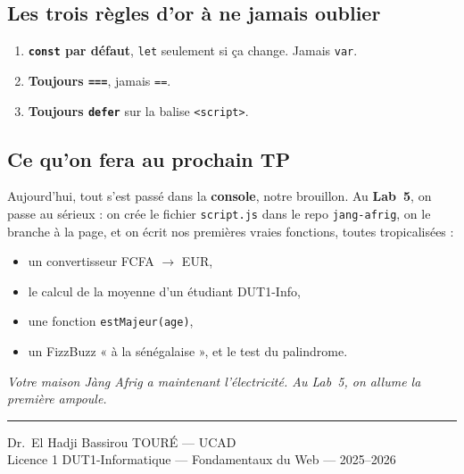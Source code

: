 \documentclass[11pt,a4paper]{article}
\newcommand{\code}[1]{\texttt{#1}}
\begin{document}
\subsection{Les trois règles d'or à ne jamais oublier}

\begin{retenirbox}
\begin{enumerate}[leftmargin=*,noitemsep]
  \item \textbf{\code{const} par défaut}, \code{let} seulement si ça change. Jamais \code{var}.
  \item \textbf{Toujours \code{===}}, jamais \code{==}.
  \item \textbf{Toujours \code{defer}} sur la balise \code{<script>}.
\end{enumerate}
\end{retenirbox}

\subsection{Ce qu'on fera au prochain TP}

Aujourd'hui, tout s'est passé dans la \textbf{console}, notre brouillon. Au \textbf{Lab~5}, on passe au sérieux : on crée le fichier \code{script.js} dans le repo \code{jang-afrig}, on le branche à la page, et on écrit nos premières vraies fonctions, toutes tropicalisées :
\begin{itemize}[leftmargin=*,noitemsep]
  \item un convertisseur FCFA $\rightarrow$ EUR,
  \item le calcul de la moyenne d'un étudiant DUT1-Info,
  \item une fonction \code{estMajeur(age)},
  \item un FizzBuzz « à la sénégalaise », et le test du palindrome.
\end{itemize}

\begin{center}
\textit{Votre maison Jàng Afrig a maintenant l'électricité. Au Lab~5, on allume la première ampoule.}
\end{center}

\bigskip
\noindent\rule{\textwidth}{0.4pt}
\begin{center}
\small Dr.~El Hadji Bassirou TOURÉ --- UCAD\\
\small Licence 1 DUT1-Informatique --- Fondamentaux du Web --- 2025--2026
\end{center}
\end{document}
